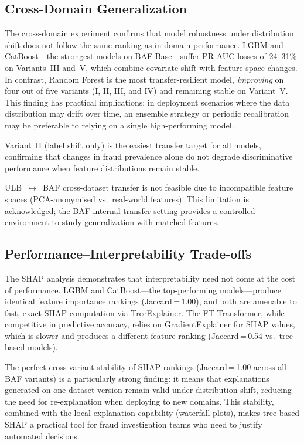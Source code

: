 \subsection{Cross-Domain Generalization}

The cross-domain experiment confirms that model robustness under distribution shift does not follow the same ranking as in-domain performance.
LGBM and CatBoost---the strongest models on BAF Base---suffer PR-AUC losses of 24--31\% on Variants~III and~V, which combine covariate shift with feature-space changes.
In contrast, Random Forest is the most transfer-resilient model, \emph{improving} on four out of five variants (I, II, III, and IV) and remaining stable on Variant~V.
This finding has practical implications: in deployment scenarios where the data distribution may drift over time, an ensemble strategy or periodic recalibration may be preferable to relying on a single high-performing model.

Variant~II (label shift only) is the easiest transfer target for all models, confirming that changes in fraud prevalence alone do not degrade discriminative performance when feature distributions remain stable.

ULB~$\leftrightarrow$~BAF cross-dataset transfer is not feasible due
to incompatible feature spaces (PCA-anonymised vs.\ real-world features).
This limitation is acknowledged; the BAF internal transfer setting
provides a controlled environment to study generalization with matched features.

\subsection{Performance--Interpretability Trade-offs}

The SHAP analysis demonstrates that interpretability need not come at the cost of performance.
LGBM and CatBoost---the top-performing models---produce identical feature importance rankings (Jaccard\,=\,1.00), and both are amenable to fast, exact SHAP computation via TreeExplainer.
The FT-Transformer, while competitive in predictive accuracy, relies on GradientExplainer for SHAP values, which is slower and produces a different feature ranking (Jaccard\,=\,0.54 vs.\ tree-based models).

The perfect cross-variant stability of SHAP rankings (Jaccard\,=\,1.00 across all BAF variants) is a particularly strong finding: it means that explanations generated on one dataset version remain valid under distribution shift, reducing the need for re-explanation when deploying to new domains.
This stability, combined with the local explanation capability (waterfall plots), makes tree-based SHAP a practical tool for fraud investigation teams who need to justify automated decisions.

